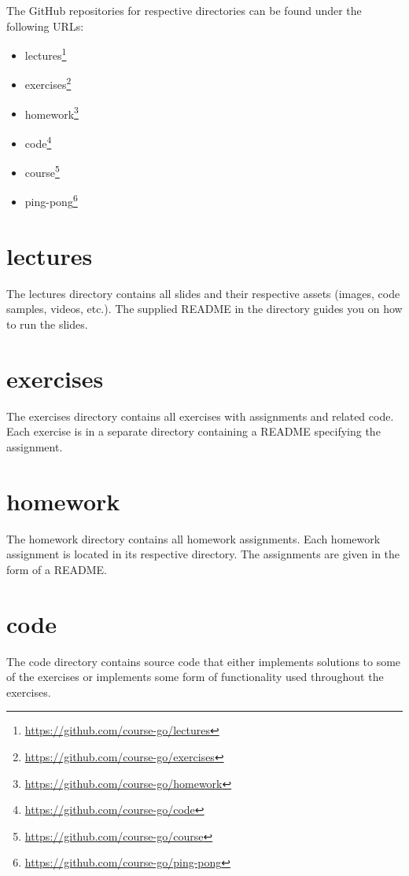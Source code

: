 \documentclass[
  digital,
  color,
  oneside,
  nosansbold,
  nocolorbold,
  nolof,
  nolot,
]{fithesis4}
\begin{document}
The GitHub repositories for respective directories can be found under the following URLs:
\begin{itemize}
    \item lectures\footnote{\url{https://github.com/course-go/lectures}}
    \item exercises\footnote{\url{https://github.com/course-go/exercises}}
    \item homework\footnote{\url{https://github.com/course-go/homework}}
    \item code\footnote{\url{https://github.com/course-go/code}}
    \item course\footnote{\url{https://github.com/course-go/course}}
    \item ping-pong\footnote{\url{https://github.com/course-go/ping-pong}}
\end{itemize}

\section{lectures}

The lectures directory contains all slides and their respective assets (images, code samples, videos, etc.). The supplied README in the directory guides you on how to run the slides.

\section{exercises}

The exercises directory contains all exercises with assignments and related code. Each exercise is in a separate directory containing a README specifying the assignment.

\section{homework}

The homework directory contains all homework assignments. Each homework assignment is located in its respective directory. The assignments are given in the form of a README.

\section{code}

The code directory contains source code that either implements solutions to some of the exercises or implements some form of functionality used throughout the exercises.
\end{document}
